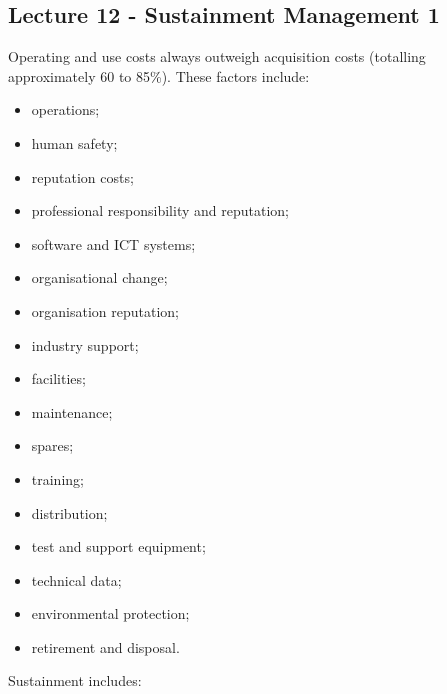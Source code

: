 \documentclass[journal]{IEEEtran}
\begin{document}
\subsection{Lecture 12 - Sustainment Management 1}
Operating and use costs always outweigh acquisition costs (totalling approximately 60 to 85\%). These factors include:
\begin{itemize}
	\item operations;
	\item human safety;
	\item reputation costs;
	\item professional responsibility and reputation;
	\item software and ICT systems;
	\item organisational change;
	\item organisation reputation;
	\item industry support;
	\item facilities;
	\item maintenance;
	\item spares;
	\item training;
	\item distribution;
	\item test and support equipment;
	\item technical data;
	\item environmental protection;
	\item retirement and disposal.
\end{itemize}
Sustainment includes:
\end{document}
